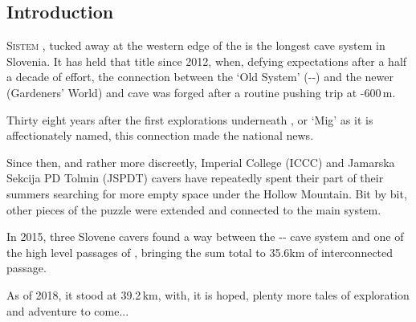\begin{tcolorbox} %
\vspace{60pt}
	\part{Introduction}
	\lettrine{S}{istem} , tucked away at the western edge of the  is the longest cave system in Slovenia.  It has held that title since 2012, when, defying expectations after a half a decade of effort, the connection between the `Old System' (--) and the newer  (Gardeners' World) and  cave was forged after a routine pushing trip at -600\,m.

Thirty eight years after the first explorations underneath , or `Mig' as it is affectionately named, this connection made the national news. 

Since then, and rather more discreetly, Imperial College (ICCC) and Jamarska Sekcija PD Tolmin (JSPDT) cavers have repeatedly spent their part of their summers searching for more empty space under the Hollow Mountain. Bit by bit, other pieces of the puzzle were extended and connected to the main system.

In 2015, three Slovene cavers found a way between the -- cave system and one of the high level passages of , bringing the sum total to 35.6km of interconnected passage. 

As of 2018, it stood at 39.2\,km, with, it is hoped, plenty more tales of exploration and adventure to come...


\end{tcolorbox}
